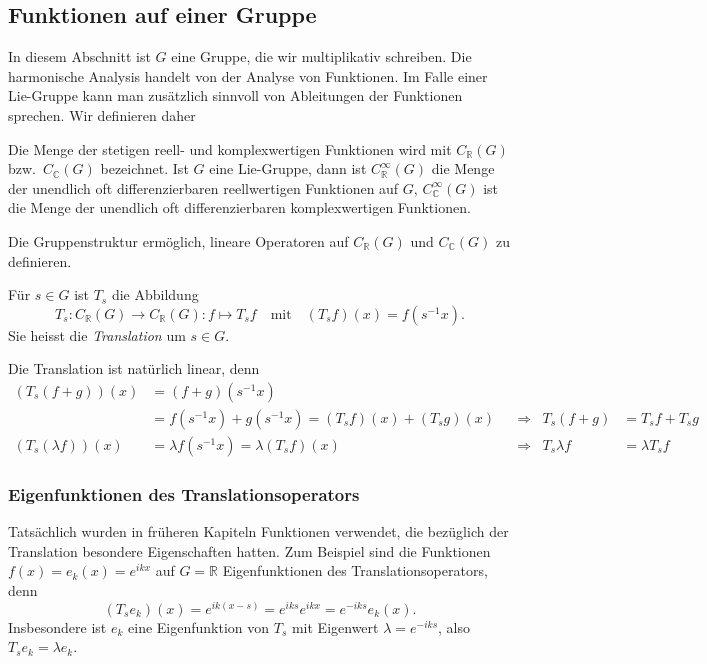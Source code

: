%
%
\subsection{Funktionen auf einer Gruppe
\label{buch:gruppen:subsection:funktionen}}
In diesem Abschnitt ist $G$ eine Gruppe, die wir multiplikativ
schreiben.
Die harmonische Analysis handelt von der Analyse von Funktionen.
Im Falle einer Lie-Gruppe kann man zusätzlich sinnvoll von Ableitungen
der Funktionen sprechen.
Wir definieren daher

\begin{definition}
\label{buch:gruppen:gruppe:def:funktionenaufgruppe}
Die Menge der stetigen reell- und komplexwertigen Funktionen wird mit
$C_{\mathbb{R}}(G)$ bzw.~$C_{\mathbb{C}}(G)$ bezeichnet.
Ist $G$ eine Lie-Gruppe, dann ist
$C_{\mathbb{R}}^\infty(G)$ die Menge der unendlich oft differenzierbaren
reellwertigen Funktionen auf $G$,
$C_{\mathbb{C}}^\infty(G)$ ist die Menge der unendlich oft differenzierbaren
komplexwertigen Funktionen.
\end{definition}

Die Gruppenstruktur ermöglich, lineare Operatoren auf $C_{\mathbb{R}}(G)$
und $C_{\mathbb{C}}(G)$ zu definieren.

\begin{definition}
\label{buch:gruppen:gruppe:def:translation}
Für $s\in G$ ist $T_s$ die Abbildung
\[
T_s
\colon
C_{\mathbb{R}}(G) \to C_{\mathbb{R}}(G)
:
f \mapsto T_sf
\quad
\text{mit}
\quad
(T_sf)(x) = f(s^{-1}x).
\]
Sie heisst die {\em Translation} um $s\in G$.
\end{definition}

Die Translation ist natürlich linear, denn
\begin{align*}
(T_s(f+g))(x)
&=
(f+g)(s^{-1}x)
\\
&=
f(s^{-1}x) + g(s^{-1}x)
=
(T_sf)(x) + (T_sg)(x)
&&\Rightarrow&
T_s(f+g)&=T_sf+T_sg
\\
(T_s(\lambda f))(x)
&=
\lambda f(s^{-1}x)
=
\lambda (T_sf)(x)
&&\Rightarrow&
T_s\lambda f
&=
\lambda T_sf
\end{align*}

%
%
\subsubsection{Eigenfunktionen des Translationsoperators}
Tatsächlich wurden in früheren Kapiteln Funktionen verwendet, die
bezüglich der Translation besondere Eigenschaften hatten.
Zum Beispiel sind die Funktionen $f(x)=e_k(x)=e^{ikx}$ auf $G=\mathbb{R}$
Eigenfunktionen des Translationsoperators, denn
\[
(T_se_k)(x)
=
e^{ik(x-s)}
=
e^{iks}e^{ikx}
=
e^{-iks} e_k(x).
\]
Insbesondere ist $e_k$ eine Eigenfunktion von $T_s$ mit Eigenwert
$\lambda=e^{-iks}$, also $T_se_k = \lambda e_k$.

